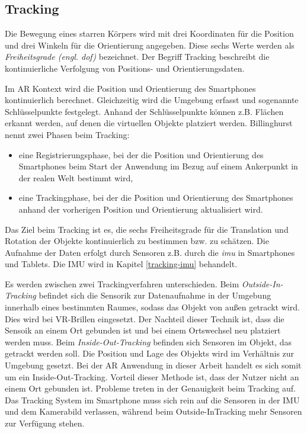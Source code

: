 \subsection{Tracking}
\label{tracking}
Die Bewegung eines starren Körpers wird mit drei Koordinaten für die Position und drei Winkeln für die Orientierung angegeben\cite*[Dörner (2019) S.119f.,][]{doerner}. Diese sechs Werte werden als \textit{Freiheitsgrade (engl. \acrfull{dof})} bezeichnet. Der Begriff Tracking beschreibt die kontinuierliche Verfolgung von Positions- und Orientierungsdaten.

Im AR Kontext wird die Position und Orientierung des Smartphones kontinuierlich berechnet. Gleichzeitig wird die Umgebung erfasst und sogenannte Schlüsselpunkte festgelegt. Anhand der Schlüsselpunkte können z.B. Flächen erkannt werden, auf denen die virtuellen Objekte platziert werden. Billinghurst\cite[][]{billinghurst2015} nennt zwei Phasen beim Tracking:

\begin{itemize}
    \item eine Registrierungsphase, bei der die Position und Orientierung des Smartphones beim Start der Anwendung im Bezug auf einem Ankerpunkt in der realen Welt bestimmt wird,
    \item eine Trackingphase, bei der die Position und Orientierung des Smartphones anhand der vorherigen Position und Orientierung aktualisiert wird.
\end{itemize}

Das Ziel beim Tracking ist es, die sechs Freiheitsgrade für die Translation und Rotation der Objekte kontinuierlich zu bestimmen bzw. zu schätzen. Die Aufnahme der Daten erfolgt durch Sensoren z.B. durch die \textit{\acrfull{imu}} in Smartphones und Tablets. Die IMU wird in Kapitel \ref*{tracking-imu} behandelt.

Es werden zwischen zwei Trackingverfahren unterschieden. Beim \textit{Outside-In-Tracking} befindet sich die Sensorik zur Datenaufnahme in der Umgebung innerhalb eines bestimmten Raumes, sodass das Objekt von außen getrackt wird. Dies wird bei VR-Brillen eingesetzt. Der Nachteil dieser Technik ist, dass die Sensoik an einem Ort gebunden ist und bei einem Ortswechsel neu platziert werden muss. Beim \textit{Inside-Out-Tracking} befinden sich Sensoren im Objekt, das getrackt werden soll. Die Position und Lage des Objekts wird im Verhältnis zur Umgebung gesetzt. Bei der AR Anwendung in dieser Arbeit handelt es sich somit um ein Inside-Out-Tracking. Vorteil dieser Methode ist, dass der Nutzer nicht an einem Ort gebunden ist. Probleme treten in der Genauigkeit beim Tracking auf. Das Tracking System im Smartphone muss sich rein auf die Sensoren in der IMU und dem Kamerabild verlassen, während beim Outside-InTracking mehr Sensoren zur Verfügung stehen.

